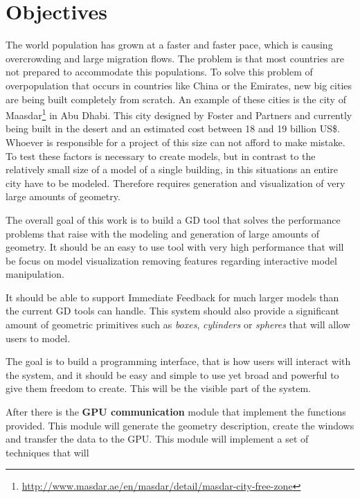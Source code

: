 
% 
% 

\section{Objectives}
\label{sec:objectives}

The world population has grown at a faster and faster pace, which is causing overcrowding and large migration flows. The problem is that most countries are not prepared to accommodate this populations. 
To solve this problem of overpopulation that occurs in countries like China or the Emirates, new big cities are being built  completely from scratch. An example of these cities is the city of Maasdar\footnote{\url{http://www.masdar.ae/en/masdar/detail/masdar-city-free-zone}} in Abu Dhabi. This city designed by Foster and Partners and currently being built in the desert and an estimated cost between 18 and 19 billion US\$. Whoever is responsible for a project of this size can not afford to make mistake.
To test these factors is necessary to create models, but in contrast to the relatively small size of a model of a single building, in this situations an entire city have to be modeled. Therefore requires generation and visualization of very large amounts of geometry.

The overall goal of this work is to build a GD tool that solves the performance problems that raise with the modeling and generation of large amounts of geometry. It should be an easy to use tool with very high performance that will be focus on model visualization removing features regarding interactive model manipulation.

It should be able to support Immediate Feedback for much larger models than the current GD tools can handle. This system should also provide a significant amount of geometric primitives such as \emph{boxes}, \emph{cylinders} or \emph{spheres} that will allow users to model.

The goal is to build a programming interface, that is how users will interact with the system, and it should be easy and simple to use yet broad and powerful to give them freedom to create. This will be the visible part of the system. 

After there is the \textbf{GPU communication} module that implement the functions provided. This module will generate the geometry description, create the windows and transfer the data to the GPU. This module will implement a set of techniques that will 

